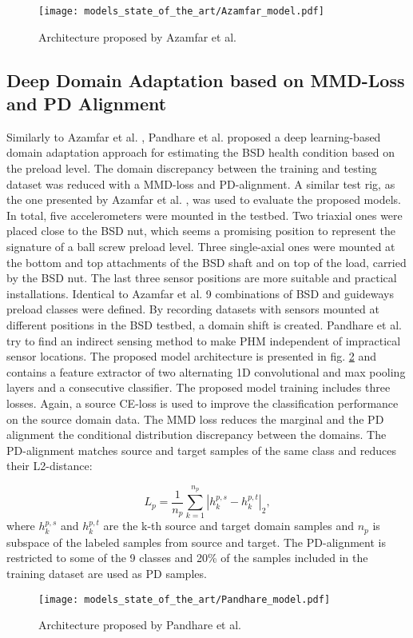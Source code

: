 \begin{figure}[H]
  \centering
  \texttt{[image: models\_state\_of\_the\_art/Azamfar\_model.pdf]}
  \caption{Architecture proposed by Azamfar et al. \cite{AZAMFAR2020103932}}
  \label{fig:Azamfar_model}
\end{figure}


\subsection{Deep Domain Adaptation based on MMD-Loss and PD Alignment}
Similarly to Azamfar et al. \cite{AZAMFAR2020103932}, Pandhare et al. \cite{Pandhare2021} proposed a deep learning-based domain adaptation approach for estimating the BSD health condition based on the preload level. The domain discrepancy between the training and testing dataset was reduced with a MMD-loss and PD-alignment. A similar test rig, as the one presented by Azamfar et al. \cite{AZAMFAR2020103932}, was used to evaluate the proposed models. In total, five accelerometers were mounted in the testbed. Two triaxial ones were placed close to the BSD nut, which seems a promising position to represent the signature of a ball screw preload level. Three single-axial ones were mounted at the bottom and top attachments of the BSD shaft and on top of the load, carried by the BSD nut. The last three sensor positions are more suitable and practical installations. Identical to Azamfar et al. \cite{AZAMFAR2020103932} 9 combinations of BSD and guideways preload classes were defined. By recording datasets with sensors mounted at different positions in the BSD testbed, a domain shift is created. Pandhare et al. \cite{Pandhare2021} try to find an indirect sensing method to make PHM independent of impractical sensor locations. The proposed model architecture is presented in fig. \ref{fig:Pandhare_model} and contains a feature extractor of two alternating 1D convolutional and max pooling layers and a consecutive classifier. The proposed model training includes three losses. Again, a source CE-loss is used to improve the classification performance on the source domain data. The MMD loss reduces the marginal and the PD alignment the conditional distribution discrepancy between the domains. The PD-alignment matches source and target samples of the same class and reduces their L2-distance: 

\begin{equation}
    L_{p} = \frac{1}{n_{p}}\sum_{k=1}^{n_{p}}|h_{k}^{p,s}-h_{k}^{p,t}|_{2}, 
\end{equation}
where $h_{k}^{p,s}$ and $h_{k}^{p,t}$ are the k-th source and target domain samples and $n_{p}$ is subspace of the labeled samples from source and target. The PD-alignment is restricted to some of the 9 classes and 20\% of the samples included in the training dataset are used as PD samples.
\begin{figure}[H]
  \centering
  \texttt{[image: models\_state\_of\_the\_art/Pandhare\_model.pdf]}
  \caption{Architecture proposed by Pandhare et al. \cite{Pandhare2021}}
  \label{fig:Pandhare_model}
\end{figure}


